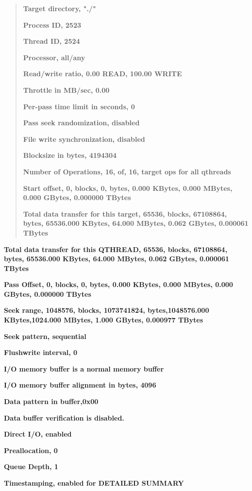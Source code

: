 \begin{quote}
\textbf{Target directory, "./"}

\textbf{Process ID, 2523}

\textbf{Thread ID, 2524}

\textbf{Processor, all/any}

\textbf{Read/write ratio, 0.00 READ, 100.00 WRITE}

\textbf{Throttle in MB/sec, 0.00}

\textbf{Per-pass time limit in seconds, 0}

\textbf{Pass seek randomization, disabled}

\textbf{File write synchronization, disabled}

\textbf{Blocksize in bytes, 4194304}

\textbf{Number of Operations, 16, of, 16, target ops for all qthreads}

\textbf{Start offset, 0, blocks, 0, bytes, 0.000 KBytes, 0.000 MBytes, 0.000 GBytes, 0.000000 TBytes}

\textbf{Total data transfer for this target, 65536, blocks, 67108864, bytes, 65536.000 KBytes, 64.000 MBytes, 0.062 GBytes, 0.000061 TBytes}
\end{quote}

\textbf{Total data transfer for this QTHREAD, 65536, blocks, 67108864, bytes, 65536.000 KBytes, 64.000 MBytes, 0.062 GBytes, 0.000061 TBytes}

\textbf{Pass Offset, 0, blocks, 0, bytes, 0.000 KBytes, 0.000 MBytes, 0.000 GBytes, 0.000000 TBytes}

\textbf{Seek range, 1048576, blocks, 1073741824, bytes,1048576.000 KBytes,1024.000 MBytes, 1.000 GBytes, 0.000977 TBytes}

\textbf{Seek pattern, sequential}

\textbf{Flushwrite interval, 0}

\textbf{I/O memory buffer is a normal memory buffer}

\textbf{I/O memory buffer alignment in bytes, 4096}

\textbf{Data pattern in buffer,0x00}

\textbf{Data buffer verification is disabled.}

\textbf{Direct I/O, enabled}

\textbf{Preallocation, 0}

\textbf{Queue Depth, 1}

\textbf{Timestamping, enabled for DETAILED SUMMARY}

